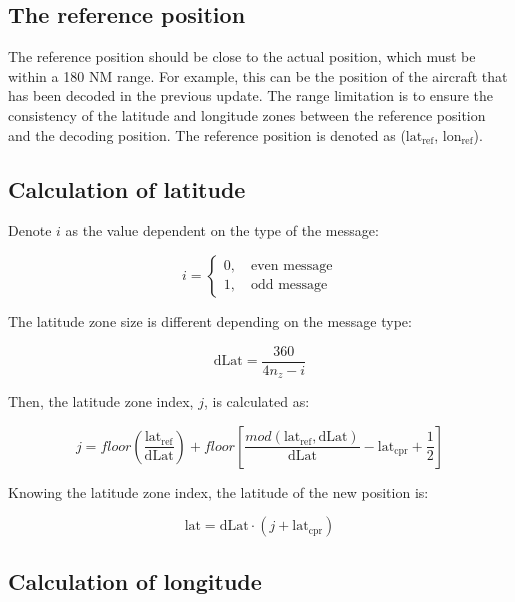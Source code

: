 \subsection{The reference position}

The reference position should be close to the actual position, which must be within a 180 NM range. For example, this can be the position of the aircraft that has been decoded in the previous update. The range limitation is to ensure the consistency of the latitude and longitude zones between the reference position and the decoding position. The reference position is denoted as ($\mathrm{lat}_\mathrm{ref}$, $\mathrm{lon}_\mathrm{ref}$).

\subsection{Calculation of latitude}

Denote $i$ as the value dependent on the type of the message:

\begin{equation}
  i =
  \begin{cases}
    0, \quad \text{even message} \\
    1, \quad \text{odd message}
  \end{cases}
\end{equation}

\noindent The latitude zone size is different depending on the message type:

\begin{equation}
  \mathrm{dLat} = \frac{360}{4n_z-i}
\end{equation}

Then, the latitude zone index, $j$, is calculated as:

\begin{equation}
  j = floor \left( \frac{\mathrm{lat}_\mathrm{ref}}{\mathrm{dLat}} \right) + floor \left[ \frac{mod(\mathrm{lat}_\mathrm{ref}, \mathrm{dLat})}{\mathrm{dLat}}  - \mathrm{lat}_\mathrm{cpr}  + \frac{1}{2} \right]
\end{equation}

Knowing the latitude zone index, the latitude of the new position is:

\begin{equation}
  \mathrm{lat} = \mathrm{dLat} \cdot (j + \mathrm{lat}_\mathrm{cpr})
\end{equation}


\subsection{Calculation of longitude}

